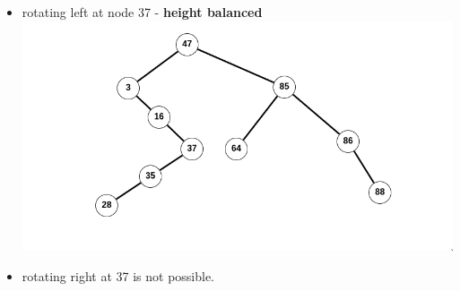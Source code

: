 \documentclass[12pt,twoside]{article}
\begin{document}
\begin{problems}
\begin{problemparts}
\begin{itemize}
  \item rotating left at node 37 - \textbf{height balanced} \\
\includegraphics[width=1.0\textwidth]{./trees/img7.png}
  \item rotating right at 37 is not possible.
\end{itemize}
\end{problemparts}

\newpage
\problem  %


\end{problems}
\end{document}
